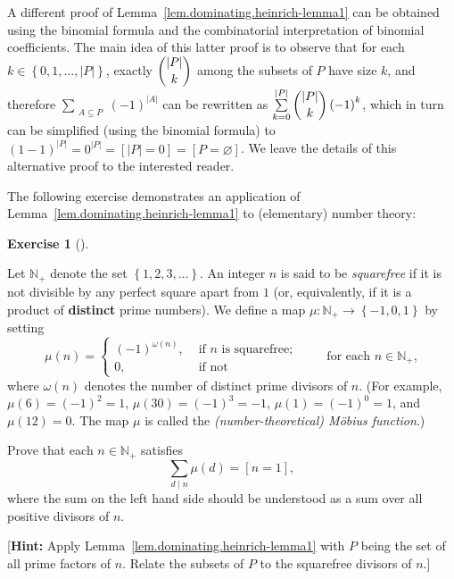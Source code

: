 \documentclass[numbers=enddot,12pt,final,onecolumn,notitlepage]{scrartcl}%
\theoremstyle{definition}
\newtheorem{exmp}[theo]{Exercise}
\newenvironment{exercise}[1][]
{\begin{exmp}[#1]\begin{leftbar}}
{\end{leftbar}\end{exmp}}
\let\sumnonlimits\sum
\renewcommand{\sum}{\sumnonlimits\limits}
\newcommand{\NN}{\mathbb{N}}
\newcommand{\set}[1]{\left\{ #1 \right\}}
\newcommand{\abs}[1]{\left| #1 \right|}
\newcommand{\tup}[1]{\left( #1 \right)}
\newcommand{\ive}[1]{\left[ #1 \right]}
\begin{document}
A different proof of Lemma~\ref{lem.dominating.heinrich-lemma1} can
be obtained using the binomial formula and the combinatorial
interpretation of binomial coefficients. The main idea of this latter
proof is to observe that for each $k \in \set{0,1,\ldots,\abs{P}}$,
exactly $\dbinom{\abs{P}}{k}$ among the subsets of $P$ have size $k$,
and therefore
$\sum_{\substack{A \subseteq P}} \tup{-1}^{\abs{A}}$ can be rewritten
as $\sum_{k=0}^{\abs{P}} \dbinom{\abs{P}}{k} \tup{-1}^k$, which in
turn can be simplified (using the binomial formula) to
$\tup{1-1}^{\abs{P}} = 0^{\abs{P}} = \ive{\abs{P} = 0}
= \ive{P = \varnothing}$. We leave the details of this alternative
proof to the interested reader.

The following exercise demonstrates an application of
Lemma~\ref{lem.dominating.heinrich-lemma1} to (elementary) number
theory:

\begin{exercise} \label{exe.dominating.heinrich-lemma-moeb-NT}
Let $\NN_+$ denote the set $\set{1, 2, 3, \ldots}$. An integer $n$ is
said to be \textit{squarefree} if it is not divisible by any perfect
square apart from $1$ (or, equivalently, if it is a product of
\textbf{distinct} prime numbers). We define a map
$\mu : \NN_+ \to \set{-1, 0, 1}$ by setting
\[
\mu\tup{n}
= \begin{cases}
\tup{-1}^{\omega\tup{n}}, & \text{ if } n \text{ is squarefree;} \\
0,                        & \text{ if not }
\end{cases}
\qquad \text{ for each } n \in \NN_+ ,
\]
where $\omega\tup{n}$ denotes the number of distinct prime divisors
of $n$. (For example, $\mu\tup{6} = \tup{-1}^2 = 1$,
$\mu\tup{30} = \tup{-1}^3 = -1$,
$\mu\tup{1} = \tup{-1}^0 = 1$, and $\mu\tup{12} = 0$. The map $\mu$
is called the \textit{(number-theoretical) M\"obius function}.)

Prove that each $n \in \NN_+$ satisfies
\[
\sum_{d\mid n} \mu\tup{d} = \ive{n = 1},
\]
where the sum on the left hand side should be understood as a sum over
all positive divisors of $n$.

[\textbf{Hint:} Apply Lemma~\ref{lem.dominating.heinrich-lemma1} with
$P$ being the set of all prime factors of $n$. Relate the subsets of
$P$ to the squarefree divisors of $n$.]
\end{exercise}
\end{document}
